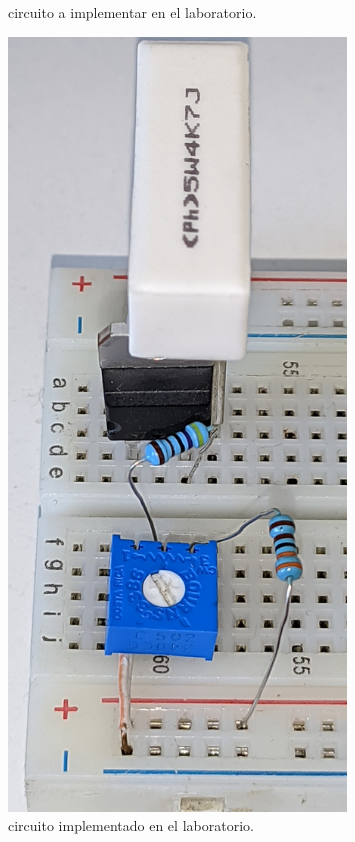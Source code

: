         \begin{figure}[!ht]
          \centering
          \begin{minipage}{0.7\textwidth}
            \centering
            \resizebox{1\textwidth}{!}{
            
            }
            \caption{circuito a implementar en el laboratorio.}
            \label{crkt:scr_vak0_lab}
          \end{minipage}
          \hfill
          \begin{minipage}{0.25\textwidth}
            \centering
            \includegraphics[width=0.8\textwidth]{pictures/prot_scr.jpg}
            \caption{circuito implementado en el laboratorio.}
          \end{minipage}
        \end{figure}

